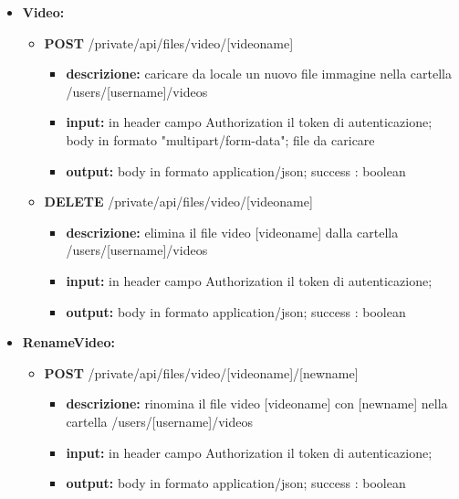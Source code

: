 {{\begin{itemize}
		\item \textbf{Video:}
			\begin{itemize}
			\item    \textbf{POST} /private/api/files/video/[videoname]
				\begin{itemize} 
				\item \textbf{descrizione:} caricare da locale un nuovo file immagine nella cartella /users/[username]/videos					
				\item \textbf{input:} in header campo Authorization il token di autenticazione; body in formato "multipart/form-data"; file da caricare
				\item \textbf{output:} body in formato application/json; success : boolean
				\end{itemize}
			\item   \textbf{DELETE} /private/api/files/video/[videoname]
				\begin{itemize} 
				\item \textbf{descrizione:} elimina il file video [videoname] dalla cartella /users/[username]/videos			
				\item \textbf{input:} in header campo Authorization il token di autenticazione;
				\item \textbf{output:} body in formato application/json; success : boolean
				\end{itemize}
			\end{itemize}
			
		\item \textbf{RenameVideo:}
			\begin{itemize}
			\item   \textbf{POST} /private/api/files/video/[videoname]/[newname] 
				\begin{itemize} 
				\item \textbf{descrizione:} rinomina il file video [videoname] con [newname] nella cartella /users/[username]/videos
				\item \textbf{input:} in header campo Authorization il token di autenticazione;
				\item \textbf{output:} body in formato application/json; success : boolean
				\end{itemize}
			\end{itemize}

			
	\end{itemize}
	}
}
	
	
	
	
	
	
	
	
	
	
	
	
	
	
	